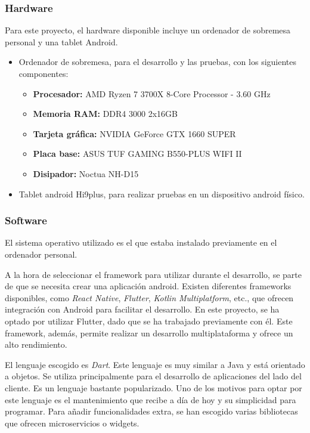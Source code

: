 \documentclass[a4paper, 12pt]{article}
\begin{document}
\subsubsection{Hardware}

Para este proyecto, el hardware disponible incluye un ordenador de sobremesa personal y una tablet Android.

\begin{itemize}[noitemsep]
	\item Ordenador de sobremesa, para el desarrollo y las pruebas, con los siguientes componentes:
		\begin{itemize}[noitemsep]
			\item \textbf{Procesador:} AMD Ryzen 7 3700X 8-Core Processor - 3.60 GHz
			\item \textbf{Memoria RAM:} DDR4 3000 2x16GB
			\item \textbf{Tarjeta gráfica:} NVIDIA GeForce GTX 1660 SUPER
			\item \textbf{Placa base:} ASUS TUF GAMING B550-PLUS WIFI II
			\item \textbf{Disipador:} Noctua NH-D15
		\end{itemize}
	\item Tablet android Hi9plus, para realizar pruebas en un dispositivo android físico.
\end{itemize}

\subsubsection{Software}

El sistema operativo utilizado es el que estaba instalado previamente en el ordenador personal.

A la hora de seleccionar el framework para utilizar durante el desarrollo, se parte de que se necesita crear una aplicación android. Existen diferentes frameworks disponibles, como \textit{React Native}, \textit{Flutter}, \textit{Kotlin Multiplatform}, etc., que ofrecen integración con Android para facilitar el desarrollo. En este proyecto, se ha optado por utilizar Flutter, dado que se ha trabajado previamente con él. Este framework, además, permite realizar un desarrollo multiplataforma y ofrece un alto rendimiento.

El lenguaje escogido es \textit{Dart}. Este lenguaje es muy similar a Java y está orientado a objetos. Se utiliza principalmente para el desarrollo de aplicaciones del lado del cliente. Es un lenguaje bastante popularizado. Uno de los motivos para optar por este lenguaje es el mantenimiento que recibe a día de hoy y su simplicidad para programar. Para añadir funcionalidades extra, se han escogido varias bibliotecas que ofrecen microservicios o widgets.
\end{document}

